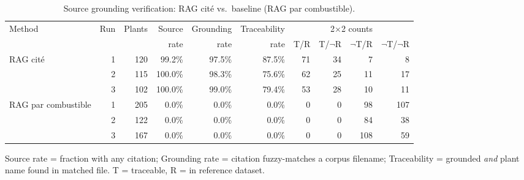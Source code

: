 \begin{table}[ht]
\centering
\caption{Source grounding verification: RAG cité vs.\ baseline (RAG par combustible).}
\label{tab:source-grounding}
\begin{tabular}{l r r r r r r r r r}
\toprule
Method & Run & Plants & Source & Grounding & Traceability & \multicolumn{4}{c}{2$\times$2 counts} \\
 & & & rate & rate & rate & T/R & T/$\neg$R & $\neg$T/R & $\neg$T/$\neg$R \\
\midrule
  RAG cité & 1 & 120 & 99.2\% & 97.5\% & 87.5\% & 71 & 34 & 7 & 8 \\
   & 2 & 115 & 100.0\% & 98.3\% & 75.6\% & 62 & 25 & 11 & 17 \\
   & 3 & 102 & 100.0\% & 99.0\% & 79.4\% & 53 & 28 & 10 & 11 \\
\midrule
  RAG par combustible & 1 & 205 & 0.0\% & 0.0\% & 0.0\% & 0 & 0 & 98 & 107 \\
   & 2 & 122 & 0.0\% & 0.0\% & 0.0\% & 0 & 0 & 84 & 38 \\
   & 3 & 167 & 0.0\% & 0.0\% & 0.0\% & 0 & 0 & 108 & 59 \\
\bottomrule
\end{tabular}
\par\smallskip\footnotesize Source rate = fraction with any citation; Grounding rate = citation fuzzy-matches a corpus filename; Traceability = grounded \emph{and} plant name found in matched file. T = traceable, R = in reference dataset.
\end{table}

